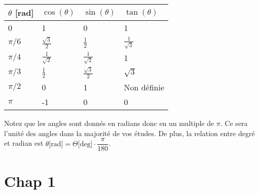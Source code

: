 \documentclass[a4paper, 12pt, french, twoside]{article}
\begin{document}
\begin{center}
\begin{tabular}{|m{1.5cm} |m{2cm}| m{2cm}|m{2cm}|} 
 \hline
    $\theta$ [rad] & $\cos (\theta)$& $\sin (\theta)$& $\tan (\theta)$\\
    \hline
    0& 1& 0&1\\
    $\pi/6$ & $\frac{\sqrt{3}}{2}$ &$\frac{1}{2}$&$\frac{1}{\sqrt{3}}$\\ 
    $\pi/4$ &$\frac{1}{\sqrt{2}}$&$\frac{1}{\sqrt{2}}$&1\\
    $\pi/3$ &$\frac{1}{2}$& $\frac{\sqrt{3}}{2}$&$\sqrt{3}$\\
    $\pi/2$ &0&1& Non définie\\
    $\pi$&-1&0&0\\
 \hline
 \end{tabular}
\end{center}
Notez que les angles sont donnés en radians donc en un multiple de $\pi$. Ce sera l'unité des angles dans la majorité de vos études. De plus, la relation entre degré et radian est $\theta \text{[rad]}= \Theta\text{[deg]}\cdot \dfrac{\pi}{180}$.



\newpage
\section{Chap 1}
\end{document}
